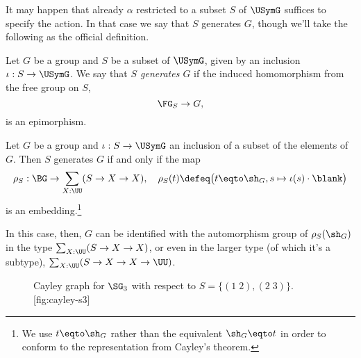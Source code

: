 It may happen that already $\alpha$ restricted to a subset $S$ of $\USymG$
suffices to specify the action.
In that case we say that $S$ generates $G$, though we'll take the following
as the official definition.
\begin{definition}\label{def:gens-gp}
  Let $G$ be a group and $S$ be a subset of $\USymG$, given by an inclusion
  $\iota : S \to \USymG$. We say that \emph{$S$ generates $G$} if the induced
  homomorphism from the free group on $S$,
  \[
    \FG_S \to G,
  \]
  is an epimorphism.
\end{definition}
\begin{lemma}\label{lem:gens-gp-iff}
  Let $G$ be a group
  and $\iota : S \to \USymG$ an inclusion of a subset of the elements of $G$.
  Then $S$ generates $G$ if and only if the map
  \[
    \rho_S : \BG \to \sum_{X:\UU}(S \to X \to X) ,
    \quad
    \rho_S(t) \defeq \bigl(t \eqto \sh_G, s \mapsto \iota(s) \cdot \blank\bigr)
  \]
  is an embedding.\footnote{We use $t \eqto \sh_G$ rather than the equivalent
    $\sh_G \eqto t$ in order to conform to the representation from Cayley's theorem.}
\end{lemma}
In this case, then, $G$ can be identified with the automorphism group of $\rho_S(\sh_G)$
in the type $\sum_{X:\UU}(S \to X \to X)$, or even in the larger type (of which it's a subtype), $\sum_{X:\UU}(S \to X \to X \to \UU)$.



\begin{figure}
  \begin{sidecaption}%
    {Cayley graph for {$\protect\SG_3$} with respect to $S = \{(1\;2),(2\;3)\}$.}[fig:cayley-s3]
  \centering
  \end{sidecaption}
\end{figure}

